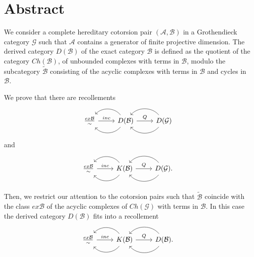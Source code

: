 \begingroup
\let\clearpage\relax
\let\cleardoublepage\relax
\let\cleardoublepage\relax

\chapter*{Abstract}
We consider a complete hereditary cotorsion pair $(\mathcal{A},\mathcal{B})$ in a Grothendieck category $\mathcal{G}$ such that $\mathcal{A}$ contains a generator of finite projective dimension. The derived category $D(\mathcal{B})$ of the exact category $\mathcal{B}$ is defined as the quotient of the category $Ch(\mathcal{B})$, of unbounded complexes with terms in $\mathcal{B}$, modulo the subcategory $\widetilde{\mathcal{B}}$ consisting of the acyclic complexes with terms in $\mathcal{B}$ and cycles in $\mathcal{B}$.

We prove that there are recollements
\begin{equation*}
  \begin{tikzcd}
    \frac{ex\mathcal{B}}{\sim}\arrow{r}{inc}
    & D(\mathcal{B})\arrow[bend left=50]{l}\arrow[bend right=50]{l}\arrow{r}{Q}
    & D(\mathcal{G})\arrow[bend left=50]{l}\arrow[bend right=50]{l}
  \end{tikzcd}
\end{equation*}
and
\begin{equation*}
  \begin{tikzcd}
    \frac{ex\mathcal{B}}{\sim}\arrow{r}{inc}
    & K(\mathcal{B})\arrow[bend left=50]{l}\arrow[bend right=50]{l}\arrow{r}{Q}
    & D(\mathcal{G}).\arrow[bend left=50]{l}\arrow[bend right=50]{l}
  \end{tikzcd}
\end{equation*}

Then, we restrict our attention to the cotorsion pairs such that $\widetilde{\mathcal{B}}$ coincide with the class $ex\mathcal{B}$ of the acyclic complexes of $Ch(\mathcal{G})$ with terms in $\mathcal{B}$. In this case the derived category $D(\mathcal{B})$ fits into a recollement
\begin{equation*}
  \begin{tikzcd}
    \frac{ex\mathcal{B}}{\sim}\arrow{r}{inc}
    & K(\mathcal{B})\arrow[bend left=50]{l}\arrow[bend right=50]{l}\arrow{r}{Q}
    & D(\mathcal{B}).\arrow[bend left=50]{l}\arrow[bend right=50]{l}
  \end{tikzcd}
\end{equation*}

